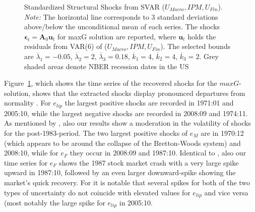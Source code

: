\documentclass[a4paper,11pt,listof=nochaptergap,oneside,pointednumbers,bibtotoc,bigheadings,liststotoc,hidelinks]{scrbook}
\theoremstyle{mysatz}
\theoremstyle{mydefinition}
\theoremstyle{mytheorem}
\theoremstyle{mybemerkung}
\newcommand{\vect}[1]{\boldsymbol{\mathbf{#1}}}
\begin{document}
\begin{figure}[!h]
   \centering
   \setlength\fboxsep{0pt}
   \setlength\fboxrule{0pt}
      \caption[Standardized Structural Shocks from SVAR ($U_{Macro}, IPM, U_{Fin}$).]{Standardized Structural Shocks from SVAR ($U_{Macro}, IPM, U_{Fin}$).\\
      \textit{Note:}  The horizontal line corresponds to 3 standard deviations above/below the unconditional mean of each series. The shocks $\vect{\epsilon}_t = \vect{A}_0\vect{u}_t$ for maxG solution are reported, where $\vect{u}_t$ holds the residuals from VAR(6) of ($U_{Macro}, IPM, U_{Fin}$). The selected bounds are $\overline{\lambda}_1 = -0.05$, $\overline{\lambda}_2 = 2$, $\overline{\lambda}_3 = 0.18$, $\overline{k}_1 = 4$, $\overline{k}_2 = 4$, $\overline{k}_3 = 2$. Grey shaded areas denote NBER recession dates in the US}   \label{fig:ludvigsonetal_timeseries_e_shocks}
\end{figure}

Figure~\ref{fig:ludvigsonetal_timeseries_e_shocks}, which shows the time series of the recovered shocks for the $maxG$-solution, shows that the extracted shocks display pronounced departures from normality \citep{ludvigsonetal:19}. For $e_{lip}$ the largest positive shocks are recorded in 1971:01 and 2005:10, while the largest negative shocks are recorded in 2008:09 and 1974:11. As mentioned by \citet{ludvigsonetal:19}, also our results show a moderation in the volatility of shocks for the post-1983-period. The two largest positive shocks of $e_{M}$ are in 1970:12 (which appears to be around the collapse of the Bretton-Woods system) and 2008:10, while for $e_{F}$ they occur in 2008:09 and 1987:10. Identical to \citet{ludvigsonetal:19}, also our time series for $e_{F}$ shows the 1987 stock market crash with a very large spike upward in 1987:10, followed by an even larger downward-spike showing the market's quick recovery. For \citet{ludvigsonetal:19} it is notable that several spikes for both of the two types of uncertainty do not coincide with elevated values for $e_{lip}$ and vice versa (most notably the large spike for $e_{lip}$ in 2005:10.
\end{document}
